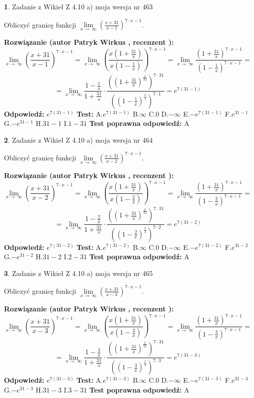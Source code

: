 \documentclass[12pt, a4paper]{article}
\theoremstyle{definition} %
\newtheorem{zad}{}
\newcommand{\zadStart}[1]{\begin{zad}#1\newline}
\newcommand{\zadStop}{\end{zad}}
\newcommand{\rozwStart}[2]{\noindent \textbf{Rozwiązanie (autor #1 , recenzent #2): }\newline}
\newcommand{\rozwStop}{\newline}
\newcommand{\odpStart}{\noindent \textbf{Odpowiedź:}\newline}
\newcommand{\odpStop}{\newline}
\newcommand{\testStart}{\noindent \textbf{Test:}\newline}
\newcommand{\testStop}{\newline}
\newcommand{\kluczStart}{\noindent \textbf{Test poprawna odpowiedź:}\newline}
\newcommand{\kluczStop}{\newline}
\begin{document}
\zadStart{Zadanie z Wikieł Z 4.10 a) moja wersja nr 463}


Obliczyć granicę funkcji  $\lim\limits_{x\to\ \infty}(\frac{x+31}{x-1})^{7\cdot x-1}$.
\zadStop
\rozwStart{Patryk Wirkus}{}
$$\lim\limits_{x\to\ \infty}(\frac{x+31}{x-1})^{7\cdot x-1} = \lim\limits_{x\to\ \infty}(\frac{x(1+\frac{31}{x})}{x(1-\frac{1}{x})})^{7\cdot x-1}=\lim\limits_{x\to\ \infty}\frac{(1+\frac{31}{x})^{7\cdot x-1}}{(1-\frac{1}{x})^{7\cdot x-1}}=$$
$$=\lim\limits_{x\to\ \infty}\frac{1-\frac{1}{x}}{1+\frac{31}{x}}\cdot\frac{((1+\frac{31}{x})^{\frac{x}{31}})^{7\cdot31}}{((1-\frac{1}{x})^{\frac{x}{1}})^{7\cdot1}}=e^{7(31-1)}$$
\rozwStop
\odpStart
$e^{7(31-1)}$
\odpStop
\testStart
A.$e^{7(31-1)}$ B.$\infty$ C.$0$ D.$-\infty$ E.$-e^{7(31-1)}$
F.$e^{31-1}$ G.$-e^{31-1}$
H.$31-1$
I.$1-31$
\testStop
\kluczStart
A
\kluczStop



\zadStart{Zadanie z Wikieł Z 4.10 a) moja wersja nr 464}


Obliczyć granicę funkcji  $\lim\limits_{x\to\ \infty}(\frac{x+31}{x-2})^{7\cdot x-1}$.
\zadStop
\rozwStart{Patryk Wirkus}{}
$$\lim\limits_{x\to\ \infty}(\frac{x+31}{x-2})^{7\cdot x-1} = \lim\limits_{x\to\ \infty}(\frac{x(1+\frac{31}{x})}{x(1-\frac{2}{x})})^{7\cdot x-1}=\lim\limits_{x\to\ \infty}\frac{(1+\frac{31}{x})^{7\cdot x-1}}{(1-\frac{2}{x})^{7\cdot x-1}}=$$
$$=\lim\limits_{x\to\ \infty}\frac{1-\frac{2}{x}}{1+\frac{31}{x}}\cdot\frac{((1+\frac{31}{x})^{\frac{x}{31}})^{7\cdot31}}{((1-\frac{2}{x})^{\frac{x}{2}})^{7\cdot2}}=e^{7(31-2)}$$
\rozwStop
\odpStart
$e^{7(31-2)}$
\odpStop
\testStart
A.$e^{7(31-2)}$ B.$\infty$ C.$0$ D.$-\infty$ E.$-e^{7(31-2)}$
F.$e^{31-2}$ G.$-e^{31-2}$
H.$31-2$
I.$2-31$
\testStop
\kluczStart
A
\kluczStop



\zadStart{Zadanie z Wikieł Z 4.10 a) moja wersja nr 465}


Obliczyć granicę funkcji  $\lim\limits_{x\to\ \infty}(\frac{x+31}{x-3})^{7\cdot x-1}$.
\zadStop
\rozwStart{Patryk Wirkus}{}
$$\lim\limits_{x\to\ \infty}(\frac{x+31}{x-3})^{7\cdot x-1} = \lim\limits_{x\to\ \infty}(\frac{x(1+\frac{31}{x})}{x(1-\frac{3}{x})})^{7\cdot x-1}=\lim\limits_{x\to\ \infty}\frac{(1+\frac{31}{x})^{7\cdot x-1}}{(1-\frac{3}{x})^{7\cdot x-1}}=$$
$$=\lim\limits_{x\to\ \infty}\frac{1-\frac{3}{x}}{1+\frac{31}{x}}\cdot\frac{((1+\frac{31}{x})^{\frac{x}{31}})^{7\cdot31}}{((1-\frac{3}{x})^{\frac{x}{3}})^{7\cdot3}}=e^{7(31-3)}$$
\rozwStop
\odpStart
$e^{7(31-3)}$
\odpStop
\testStart
A.$e^{7(31-3)}$ B.$\infty$ C.$0$ D.$-\infty$ E.$-e^{7(31-3)}$
F.$e^{31-3}$ G.$-e^{31-3}$
H.$31-3$
I.$3-31$
\testStop
\kluczStart
A
\kluczStop
\end{document}
